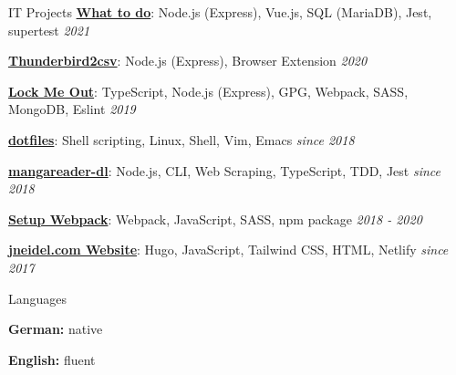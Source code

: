 \documentclass{cv}
\begin{document}
\begin{rSection}{IT Projects}
  \textbf{\href{https://github.com/jneidel/what-to-do}{What to do}}: Node.js (Express), Vue.js, SQL (MariaDB), Jest, supertest
  \hfill
  {\em 2021}

  \textbf{\href{https://github.com/jneidel/yoga-vidya-thunderbird2csv-add-on}{Thunderbird2csv}}: Node.js (Express), Browser Extension
  \hfill
  {\em 2020}

  \textbf{\href{https://github.com/jneidel/lock-me-out}{Lock Me Out}}: TypeScript, Node.js (Express), GPG, Webpack, SASS, MongoDB, Eslint
  \hfill
  {\em 2019}

  \textbf{\href{https://github.com/jneidel/dotfiles}{dotfiles}}: Shell scripting, Linux, Shell, Vim, Emacs
  \hfill
  {\em since 2018}

  \textbf{\href{https://github.com/jneidel/mangareader-dl}{mangareader-dl}}: Node.js, CLI, Web Scraping, TypeScript, TDD, Jest
  \hfill
  {\em since 2018}

  \textbf{\href{https://github.com/jneidel/setup-webpack}{Setup Webpack}}: Webpack, JavaScript, SASS, npm package
  \hfill
  {\em 2018 - 2020}

 \textbf{\href{https://github.com/jneidel/jneidel.com}{jneidel.com Website}}: Hugo, JavaScript, Tailwind CSS, HTML, Netlify
  \hfill
  {\em since 2017}

\end{rSection}
\pagebreak

\begin{rSection}{Languages}
  \begin{minipage}[l]{0.48\linewidth}
    {\bf German:} native
  \end{minipage}
  \begin{minipage}[l]{0.48\linewidth}
    {\bf English:} fluent \hfill
  \end{minipage}
\end{rSection}
\end{document}
